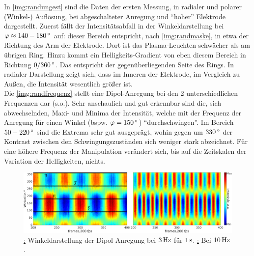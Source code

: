     In \autoref{img:randungest} sind die Daten der ersten Messung, in radialer und polarer (Winkel-) Auflösung, bei abgeschalteter Anregung und "`hoher"' Elektrode dargestellt. Zuerst fällt der Intensitätsabfall in der Winkeldarstellung bei $\varphi\approx\unit[140-180]{\degree}$ auf: dieser Bereich entspricht, nach \autoref{img:randmaske}, in etwa der Richtung des Arm der Elektrode. Dort ist das Plasma-Leuchten schwächer als am übrigen Ring. Hinzu kommt ein Helligkeits-Gradient von eben diesem Bereich in Richtung $\unit[0/360]{\degree}$. Das entspricht der gegenüberliegenden Seite des Rings. In radialer Darstellung zeigt sich, dass im Inneren der Elektrode, im Vergleich zu Außen, die Intensität wesentlich größer ist.\\
    Die \autoref{img:randfrequenz} stellt eine Dipol-Anregung bei den 2 unterschiedlichen Frequenzen dar (s.o.).  Sehr anschaulich und gut erkennbar sind die, sich abwechselnden, Maxi- und Minima der Intensität, welche mit der Frequenz der Anregung für einen Winkel (bspw. $\varphi=\unit[150]{\degree}$) "`durchschwingen"'. Im Bereich $\unit[50-220]{\degree}$ sind die Extrema sehr gut ausgeprägt, wohin gegen um $\unit[330]{\degree}$ der Kontrast zwischen den Schwingungszuständen sich weniger stark abzeichnet. Für eine höhere Frequenz der Manipulation verändert sich, bis auf die Zeitskalen der Variation der Helligkeiten, nichts.

      \begin{figure}[!b]
            \centering
            \includegraphics[width=\textwidth,height=0.38\textwidth]{figs/auswertung/plasmaglw/randdipol3hzu10Hz1sekwink.png}
            \caption{\underline{:} Winkeldarstellung der Dipol-Anregung bei $\unit[3]{Hz}$ für $\unit[1]{s}$. \underline{:} Bei $\unit[10]{Hz}$.}
            \label{img:randfrequenz}
      \end{figure}

